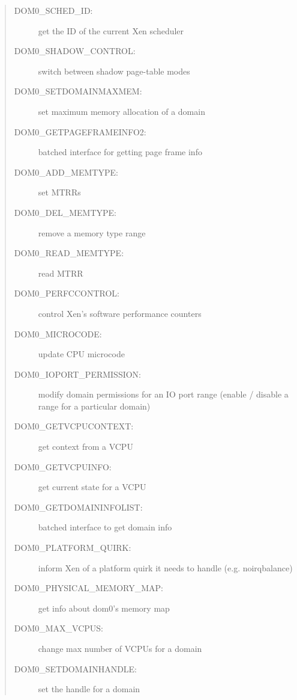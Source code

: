 \documentclass[11pt,twoside,final,openright,a4paper]{report}
\begin{document}
\begin{quote}
\begin{description}
\item [DOM0\_SCHED\_ID:] get the ID of the current Xen scheduler

\item [DOM0\_SHADOW\_CONTROL:] switch between shadow page-table modes

\item [DOM0\_SETDOMAINMAXMEM:] set maximum memory allocation of a domain

\item [DOM0\_GETPAGEFRAMEINFO2:] batched interface for getting
page frame info

\item [DOM0\_ADD\_MEMTYPE:] set MTRRs

\item [DOM0\_DEL\_MEMTYPE:] remove a memory type range

\item [DOM0\_READ\_MEMTYPE:] read MTRR

\item [DOM0\_PERFCCONTROL:] control Xen's software performance
counters

\item [DOM0\_MICROCODE:] update CPU microcode

\item [DOM0\_IOPORT\_PERMISSION:] modify domain permissions for an
IO port range (enable / disable a range for a particular domain)

\item [DOM0\_GETVCPUCONTEXT:] get context from a VCPU

\item [DOM0\_GETVCPUINFO:] get current state for a VCPU
\item [DOM0\_GETDOMAININFOLIST:] batched interface to get domain
info

\item [DOM0\_PLATFORM\_QUIRK:] inform Xen of a platform quirk it
needs to handle (e.g. noirqbalance)

\item [DOM0\_PHYSICAL\_MEMORY\_MAP:] get info about dom0's memory
map

\item [DOM0\_MAX\_VCPUS:] change max number of VCPUs for a domain

\item [DOM0\_SETDOMAINHANDLE:] set the handle for a domain

\end{description} 
\end{quote} 
\end{document}
